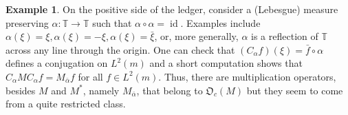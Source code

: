 \documentclass{dis}
\theoremstyle{plain}
\theoremstyle{definition}
\newtheorem{Example}[equation]{Example}
\def\T{\mathbb{T}}
\newcommand{\0}{{\color{lightgray}0}}
\begin{document}
  
\begin{Example}\label{66yTTxx)99}
On the positive side of the ledger, consider a (Lebesgue) measure preserving  $\alpha: \T \to \T$ such that $\alpha \circ \alpha = \operatorname{id}$. Examples include $\alpha(\xi) = \xi, \alpha(\xi) = - \xi, \alpha(\xi) = \bar \xi$, or, more generally, $\alpha$ is a reflection of $\T$ across any line through the origin. One can check that $(C_{\alpha} f)(\xi) = \bar {f} \circ  \alpha$ defines a conjugation on $L^2(m)$ and a short computation shows that $C_{\alpha} M C_{\alpha} f = M_{\bar \alpha} f$ for all $f \in L^2(m)$. 
Thus, there are multiplication operators, besides $M$ and $M^{*}$, namely $M_{\bar \alpha}$,  that belong to $\mathfrak{O}_c(M)$ but they seem to come from a quite restricted class. 
\end{Example} 
\end{document}
